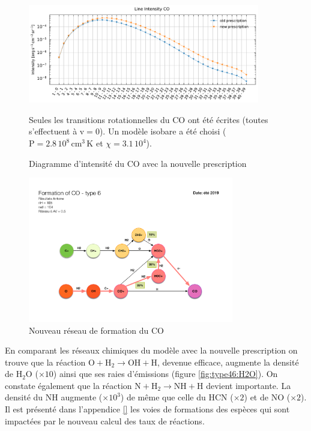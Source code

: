 \begin{figure}[!h]
    \centering \includegraphics[trim = {0 0 0 1cm},clip,width=0.9\textwidth]{figure/type46/I_comp_CO.pdf}
    \caption{Diagramme d'intensité du $\mathrm{CO}$ avec la nouvelle prescription}
    \begin{minipage}{\textwidth}
    Seules les transitions rotationnelles du $\mathrm{CO}$ ont été écrites (toutes s'effectuent à $\mathrm{v}=0$). Un modèle isobare a été choisi ($\mathrm{P} = 2.8\,10^{8} \,\mathrm{cm}^3\,\mathrm{K}$ et $\chi = 3.1\, 10^4$).
    \end{minipage}
    \label{fig:type46:CO}
\end{figure}

\begin{figure}[!h]
    \centering \includegraphics[trim = {3cm 3cm 3cm 7cm},clip,width=0.8\textwidth]{figure/type46/ChimieCO_2.pdf}
    \caption{Nouveau réseau de formation du $\mathrm{CO}$}
    \begin{minipage}{\textwidth}
    
    \end{minipage}
    \label{fig:type46:form:CO}
\end{figure}

En comparant les réseaux chimiques du modèle avec la nouvelle prescription on trouve que la réaction $\mathrm{O} + \mathrm{H}_2 \rightarrow \mathrm{OH} +  \mathrm{H}$, devenue efficace, augmente la densité de $\mathrm{H}_2\mathrm{O}$ ($\times 10$) ainsi que ses raies d'émissions (figure \ref{fig:type46:H2O}). On constate également que la réaction $\mathrm{N} + \mathrm{H}_2 \rightarrow  \mathrm{NH} +  \mathrm{H}$ devient importante. La densité du $\mathrm{NH}$ augmente ($\times 10^3$) de même que celle du $\mathrm{HCN}$ ($\times 2$) et de $\mathrm{NO}$ ($\times 2$). Il est présenté dans l'appendice \ref{} les voies de formations des espèces qui sont impactées par le nouveau calcul des taux de réactions.\newline 

